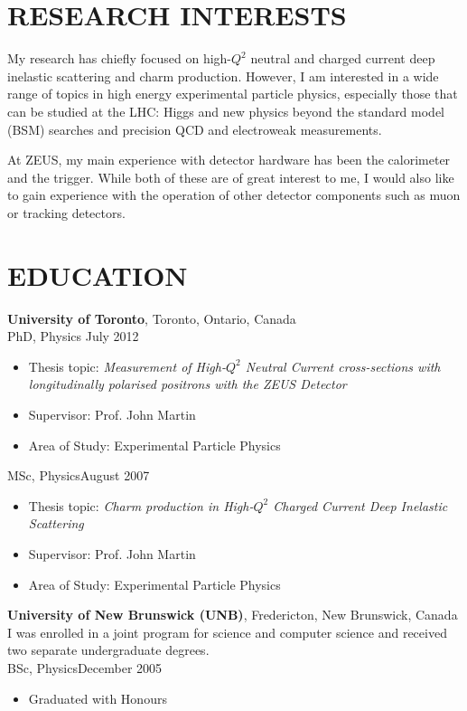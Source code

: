 \documentclass[margin]{res}
\begin{document}
 
\begin{resume} 

\section{RESEARCH INTERESTS}

My research has chiefly focused on high-$Q^2$ neutral and charged current deep inelastic scattering and charm production.  However, I am interested in a wide range of topics in high energy experimental particle physics, especially those that can be studied at the LHC: Higgs and new physics beyond the standard model (BSM) searches and precision QCD and electroweak measurements.  

At ZEUS, my main experience with detector hardware has been the calorimeter and the trigger.  While both of these are of great interest to me, I would also like to gain experience with the operation of other detector components such as muon or tracking detectors.

\section{EDUCATION}

{\bf University of Toronto}, Toronto, Ontario, Canada \\
PhD, Physics \hfill July 2012
\begin{itemize} \itemsep -2pt  %
\item Thesis topic: \textit{Measurement of High-$Q^2$ Neutral Current cross-sections with longitudinally polarised positrons with the ZEUS Detector}
\item Supervisor: Prof. John Martin
\item Area of Study: Experimental Particle Physics
\end{itemize}

MSc, Physics\hfill August 2007 
\begin{itemize} \itemsep -2pt  %
\item Thesis topic: \textit{Charm production in High-$Q^2$ Charged Current Deep Inelastic Scattering}
\item Supervisor: Prof. John Martin
\item Area of Study: Experimental Particle Physics
\end{itemize}

{\bf University of New Brunswick (UNB)}, Fredericton, New Brunswick, Canada \\
I was enrolled in a joint program for science and computer science and received two separate undergraduate degrees.\\
BSc, Physics\hfill December 2005
\begin{itemize} \itemsep -2pt  %
\item Graduated with Honours 
\end{itemize}


\end{resume}
\end{document}
